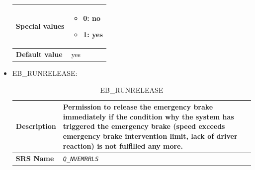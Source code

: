 \documentclass{template/openetcs}
\begin{document}
\begin{itemize}
\begin{longtable}{|l|l|}
				\hline
																																
					\begin{minipage}[t]{0.22\linewidth} \textbf{Special values}	\end{minipage} 
				&	\begin{minipage}[t]{0.78\linewidth} \begin{itemize} \item 0: no \item 1: yes \end{itemize} \end{minipage} \\
								
				\hline
										
					\begin{minipage}[t]{0.22\linewidth} \textbf{Default value}	\end{minipage} 
				&	\begin{minipage}[t]{0.78\linewidth} yes \end{minipage} \\
				
				\hline
				
			\end{longtable}
			
		\item EB\_RUNRELEASE:
		
			\begin{longtable}{|l|l|}
				\caption{EB\_RUNRELEASE}\\ 																	
				\hline
				
					\begin{minipage}[t]{0.22\linewidth} \textbf{Description}	\end{minipage} 
				&	\begin{minipage}[t]{0.78\linewidth} Permission to release the emergency brake immediately if the condition why the system has triggered the emergency brake (speed exceeds emergency brake intervention limit, lack of driver reaction) is not fulfilled any more. \end{minipage} \\
				
				\hline
				
					\begin{minipage}[t]{0.22\linewidth} \textbf{SRS Name}	\end{minipage} 
				&	\begin{minipage}[t]{0.78\linewidth} \emph{\texttt{Q\_NVEMRRLS}} \end{minipage} \\
				

\end{longtable}
\end{itemize}
\end{document}
